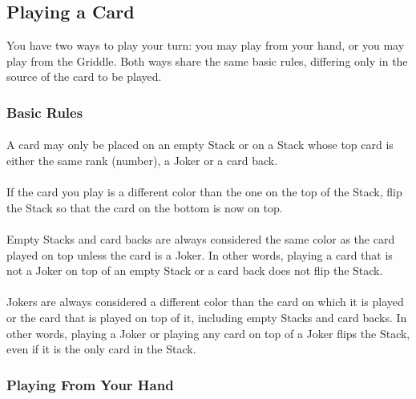 \documentclass{article}
\begin{document}
\subsection{Playing a Card}
\label{sec:playcard}

You have two ways to play your turn: you may play from your hand, or you may play from the Griddle. Both ways share the same basic rules, differing only in the source of the card to be played.

\subsubsection{Basic Rules}
\label{sec:legalplays}

\paragraph{} \label{par:basicplay}
A card may only be placed on an empty Stack or on a Stack whose top card is either the same rank (number), a Joker or a card back.

\paragraph{} \label{par:flip}
If the card you play is a different color than the one on the top of the Stack, flip the Stack so that the card on the bottom is now on top.

\paragraph{} \label{par:empty}
Empty Stacks and card backs are always considered the same color as the card played on top unless the card is a Joker.
In other words, playing a card that is not a Joker on top of an empty Stack or a card back does not flip the Stack.

\paragraph{} \label{par:joker}
Jokers are always considered a different color than the card on which it is played or the card that is played on top of it, including empty Stacks and card backs.
In other words, playing a Joker or playing any card on top of a Joker flips the Stack, even if it is the only card in the Stack.

\subsubsection{Playing From Your Hand}
\label{sec:fromhand}
\end{document}
